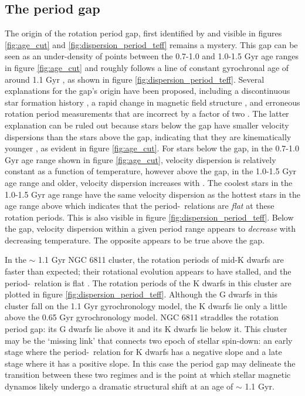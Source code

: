 \subsection{The period gap}
The origin of the rotation period gap, first identified
by \citet{mcquillan2013} and visible in figures \ref{fig:age_cut} and
\ref{fig:dispersion_period_teff} remains a mystery.
This gap can be seen as an under-density of points between the 0.7-1.0 and
1.0-1.5 Gyr age ranges in figure \ref{fig:age_cut} and roughly follows a line
of constant gyrochronal age of around 1.1 Gyr \citep[according to the
gyrochronology relation of][]{angus2019}, as shown in figure
\ref{fig:dispersion_period_teff}.
Several explanations for the gap's origin have been proposed, including a
discontinuous star formation history \citep{mcquillan2013, davenport2017,
davenport2018}, a rapid change in magnetic field structure
\citep{reinhold2019}, and erroneous rotation period measurements that are
incorrect by a factor of two \citep{koen2018}.
The latter explanation can be ruled out because stars below the gap have
smaller velocity dispersions than the stars above the gap, indicating that
they are kinematically younger \citep{mcquillan2013, davenport2018}, as
evident in figure \ref{fig:age_cut}.
For stars below the gap, in the 0.7-1.0 Gyr age range shown in figure
\ref{fig:age_cut}, velocity dispersion is relatively constant as a function of
temperature, however above the gap, in the 1.0-1.5 Gyr age range and older,
velocity dispersion increases with \teff.
The coolest stars in the 1.0-1.5 Gyr age range have the same velocity
dispersion as the hottest stars in the age range above which indicates that
the period-\teff\ relations are {\it flat} at these rotation periods.
This is also visible in figure \ref{fig:dispersion_period_teff}.
Below the gap, velocity dispersion within a given period range appears to {\it
decrease} with decreasing temperature.
The opposite appears to be true above the gap.

In the $\sim$ 1.1 Gyr NGC 6811 cluster, the rotation periods of mid-K dwarfs
are faster than expected; their rotational evolution appears to have stalled,
and the period-\teff\ relation is flat \citep{curtis2019}.
The rotation periods of the K dwarfs in this cluster are plotted in figure
\ref{fig:dispersion_period_teff}.
Although the G dwarfs in this cluster fall on the 1.1 Gyr gyrochronology
model, the K dwarfs lie only a little above the 0.65 Gyr gyrochronology model.
NGC 6811 straddles the rotation period gap: its G dwarfs lie above it and its
K dwarfs lie below it.
This cluster may be the `missing link' that connects two epoch of stellar
spin-down: an early stage where the period-\teff\ relation for K dwarfs has a
negative slope and a late stage where it has a positive slope.
In this case the period gap may delineate the transition between these two
regimes and is the point at which stellar magnetic dynamos likely undergo a
dramatic structural shift at an age of $\sim$ 1.1 Gyr.

